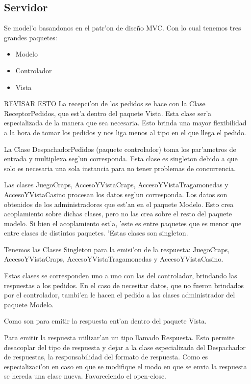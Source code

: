 \subsection{Servidor}
Se model'o basandonos en el patr'on de diseño MVC. Con lo cual tenemos tres grandes paquetes:

\begin{itemize}
 \item Modelo
 \item Controlador
 \item Vista
\end{itemize}
 
\todo REVISAR ESTO
La recepci'on de los pedidos se hace con la Clase ReceptorPedidos, que est'a dentro del paquete Vista. Esta clase ser'a especializada de la manera que sea necesaria. Esto brinda una mayor flexibilidad a la hora de tomar los pedidos y nos liga menos al tipo en el que llega el pedido.

La Clase DespachadorPedidos (paquete controlador) toma los par'ametros de entrada y multiplexa seg'un corresponda. Esta clase es singleton debido a que solo es necesaria una sola instancia para no tener problemas de concurrencia.

Las clases JuegoCraps, AccesoYVistaCraps, AccesoYVistaTragamonedas y AccesoYVistaCasino procesan los datos seg'un corresponda. Los datos son obtenidos de los administradores que est'an en el paquete Modelo. Esto crea acoplamiento sobre dichas clases, pero no las crea sobre el resto del paquete modelo. Si bien el acoplamiento est'a, 'este es entre paquetes que es menor que entre clases de distintos paquetes. 'Estas clases son singleton.

Tenemos las Clases Singleton para la emisi'on de la respuesta: JuegoCraps, AccesoYVistaCraps, AccesoYVistaTragamonedas y AccesoYVistaCasino.

Estas clases se corresponden uno a uno con las del controlador, brindando las respuestas a los pedidos. En el caso de necesitar datos, que no fueron brindados por el controlador, tambi'en le hacen el pedido a las clases administrador del paquete Modelo.

Como son para emitir la respuesta ent'an dentro del paquete Vista.

Para emitir la respuesta utilizar'an un tipo llamado Respuesta. Esto permite desacoplar del tipo de respuesta y dejar a la clase especializada del Despachador de respuestas, la responsabilidad del formato de respuesta. Como es especializaci'on en caso en que se modifique el modo en que se envia la respuesta se hereda una clase nueva. Favoreciendo el open-close.

